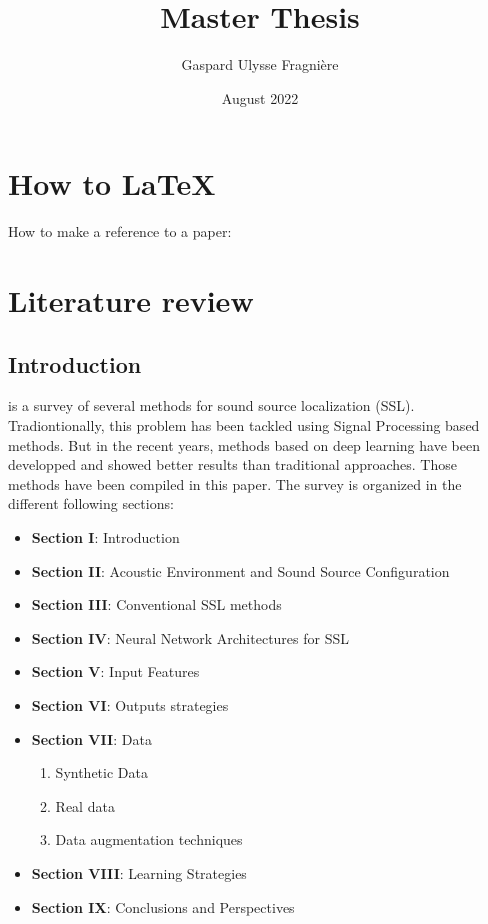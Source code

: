 \documentclass{article}
\title{Master Thesis}
\author{Gaspard Ulysse Fragnière}
\date{August 2022}
\begin{document}
\maketitle

\section{How to \LaTeX}

How to make a reference to a paper:\cite{grumiaux2022survey}


\section{Literature review}

\subsection{Introduction}

\cite{grumiaux2022survey} is a survey of several methods for sound source localization (SSL). Tradiontionally, this problem has been tackled using Signal Processing based methods. But in the recent years, methods based on deep learning have been developped and showed better results than traditional approaches. Those methods have been compiled in this paper. The survey is organized in the different following sections:

\begin{itemize}
    \item \textbf{Section I}: Introduction
    \item \textbf{Section II}: Acoustic Environment and Sound Source Configuration
    \item \textbf{Section III}: Conventional SSL methods
    \item \textbf{Section IV}: Neural Network Architectures for SSL
    \item \textbf{Section V}: Input Features
    \item \textbf{Section VI}: Outputs strategies
    \item \textbf{Section VII}: Data
    \begin{enumerate}
        \item Synthetic Data
        \item Real data
        \item Data augmentation techniques
    \end{enumerate}    
        
    \item \textbf{Section VIII}: Learning Strategies
    \item \textbf{Section IX}: Conclusions and Perspectives
    
\end{itemize}
\end{document}
